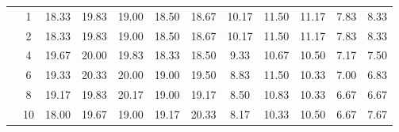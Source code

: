 \begin{table}[htpb]
\begin{tabular}{|c|c|c c c c c|c c c c c|}
\multicolumn{1}{|c|}{ \multirow{6}{*}{\rotatebox[origin=c]{90}{\textbf{K-vizinhos}}} }
&1	&18.33	&19.83	&19.00	&18.50	&18.67&	10.17	&11.50	&11.17	&7.83&	8.33\\\cline{2-12}
&2	&18.33	&19.83	&19.00	&18.50	&18.67&	10.17	&11.50	&11.17	&7.83&	8.33\\\cline{2-12}
&4	&19.67	&20.00	&19.83	&18.33	&18.50&	9.33	&10.67	&10.50&	7.17&	7.50\\\cline{2-12}
&6	&19.33	&20.33	&20.00	&19.00	&19.50&	8.83	&11.50	&10.33&	7.00&	6.83\\\cline{2-12}
&8	&19.17	&19.83	&20.17	&19.00	&19.17&	8.50	&10.83	&10.33&	6.67&	6.67\\\cline{2-12}
&10	&18.00	&19.67	&19.00	&19.17	&20.33&	8.17	&10.33	&10.50&	6.67&	7.67\\\midrule

	\end{tabular}
\end{table}



